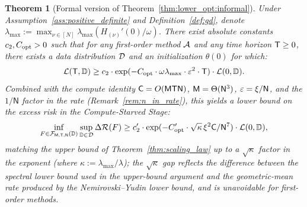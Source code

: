 \documentclass[11pt]{article}
\theoremstyle{plain}
\newtheorem{theorem}{Theorem}[section]
\begin{document}
\begin{theorem}[Formal version of Theorem~\ref{thm:lower_opt:informal}]\label{thm:lower_opt}
    Under Assumption~\ref{ass:positive_definite} and Definition~\ref{def:gd}, denote $\lambda_{\max}:= \max_{\nu\in[N]} \lambda_{\max}(H_{(\nu)}'(0)/\omega)$. There exist absolute constants $c_2, C_{\rm opt}>0$ such that for any first-order method ${\cal A}$ and any time horizon ${\sf T}\ge 0$, there exists a data distribution ${\cal D}$ and an initialization $\theta(0)$ for which:
    \begin{align*}
        {\cal L}({\sf T}, \mathbb{D}) \ge c_2\cdot \exp(-C_{\rm opt}\cdot \omega\lambda_{\max}\cdot \varepsilon^2 \cdot {\sf T}) \cdot {\cal L}(0, \mathbb{D}).
    \end{align*}
    Combined with the compute identity ${\sf C} = O({\sf MTN})$, ${\sf M}=\Theta({\sf N}^3)$, $\varepsilon = \xi/{\sf N}$, and the $1/\mathsf{N}$ factor in the rate (Remark~\ref{rem:n_in_rate}), this yields a lower bound on the excess risk in the {\it Compute-Starved Stage}:
    \begin{align*}
        \inf_{F\in{\cal F}_{\sf M, T, N}(\mathbb{D})}\sup_{\mathbb{D}\in{\cal D}} \Delta{\cal R}(F) \ge c_2'\cdot \exp(-C_{\rm opt}'\cdot \sqrt{\kappa}\,\xi^2{\sf C}/{\sf N}^7) \cdot {\cal L}(0, \mathbb{D}),
    \end{align*}
    matching the upper bound of Theorem~\ref{thm:scaling_law} up to a $\sqrt{\kappa}$ factor in the exponent (where $\kappa:=\lambda_{\max}/\lambda$); the $\sqrt{\kappa}$ gap reflects the difference between the spectral lower bound used in the upper-bound argument and the geometric-mean rate produced by the Nemirovski--Yudin lower bound, and is unavoidable for first-order methods.
\end{theorem}
\end{document}
